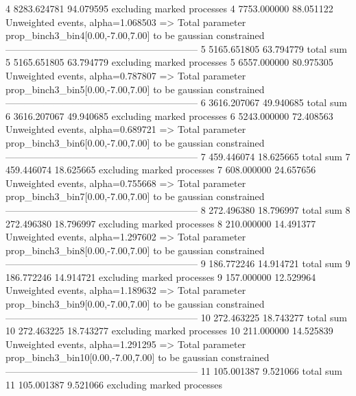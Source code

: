 4          8283.624781     94.079595       excluding marked processes    
4          7753.000000     88.051122       Unweighted events, alpha=1.068503
  => Total parameter prop_binch3_bin4[0.00,-7.00,7.00] to be gaussian constrained
------------------------------------------------------------
5          5165.651805     63.794779       total sum                     
5          5165.651805     63.794779       excluding marked processes    
5          6557.000000     80.975305       Unweighted events, alpha=0.787807
  => Total parameter prop_binch3_bin5[0.00,-7.00,7.00] to be gaussian constrained
------------------------------------------------------------
6          3616.207067     49.940685       total sum                     
6          3616.207067     49.940685       excluding marked processes    
6          5243.000000     72.408563       Unweighted events, alpha=0.689721
  => Total parameter prop_binch3_bin6[0.00,-7.00,7.00] to be gaussian constrained
------------------------------------------------------------
7          459.446074      18.625665       total sum                     
7          459.446074      18.625665       excluding marked processes    
7          608.000000      24.657656       Unweighted events, alpha=0.755668
  => Total parameter prop_binch3_bin7[0.00,-7.00,7.00] to be gaussian constrained
------------------------------------------------------------
8          272.496380      18.796997       total sum                     
8          272.496380      18.796997       excluding marked processes    
8          210.000000      14.491377       Unweighted events, alpha=1.297602
  => Total parameter prop_binch3_bin8[0.00,-7.00,7.00] to be gaussian constrained
------------------------------------------------------------
9          186.772246      14.914721       total sum                     
9          186.772246      14.914721       excluding marked processes    
9          157.000000      12.529964       Unweighted events, alpha=1.189632
  => Total parameter prop_binch3_bin9[0.00,-7.00,7.00] to be gaussian constrained
------------------------------------------------------------
10         272.463225      18.743277       total sum                     
10         272.463225      18.743277       excluding marked processes    
10         211.000000      14.525839       Unweighted events, alpha=1.291295
  => Total parameter prop_binch3_bin10[0.00,-7.00,7.00] to be gaussian constrained
------------------------------------------------------------
11         105.001387      9.521066        total sum                     
11         105.001387      9.521066        excluding marked processes    
